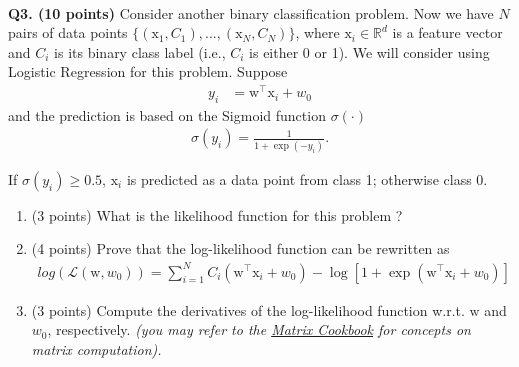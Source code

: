 \documentclass[11pt]{article}
\begin{document}
\paragraph{}
\textbf{\hspace{-0.4cm}Q3. (10 points)} Consider another binary classification problem. Now we have $N$ pairs of data points $\{(\mathrm{x}_1, C_1),...,(\mathrm{x}_N, C_N)\}$, where $\mathrm{x}_i \in \mathbb{R}^d$ is a feature vector and $C_i$ is its binary class label (i.e., $C_i$ is either 0 or
1). We will consider using Logistic Regression for this problem. Suppose
\begin{align*}
    y_i &= \mathrm{w}^\top \mathrm{x}_i + w_0
\end{align*}
and the prediction is based on the Sigmoid function $\sigma(\cdot)$
\begin{align*}
    \sigma(y_i) = \frac{1}{1 + \exp(-y_i)}.
\end{align*}

If $\sigma(y_i) \geq 0.5$, $\mathrm{x}_i$ is predicted as a data point from class 1; otherwise class 0.
\begin{enumerate}
    \item (3 points) What is the likelihood function for this problem ?
    \item (4 points) Prove that the log-likelihood function can be rewritten as 
    \begin{align*}
     log(\mathcal{L}(\mathrm{w},w_0)) = \sum_{i=1}^{N} C_i(\mathrm{w}^\top \mathrm{x}_i + w_0) - \log[1 + \exp(\mathrm{w}^\top \mathrm{x}_i + w_0)] \ 
    \end{align*}
    \item (3 points) Compute the derivatives of the log-likelihood function w.r.t. $\mathrm{w}$ and $w_0$, respectively. \textit{(you may refer to the \href{https://www.math.uwaterloo.ca/~hwolkowi/matrixcookbook.pdf}{Matrix Cookbook} for concepts on matrix computation).}
\end{enumerate}
\end{document}
